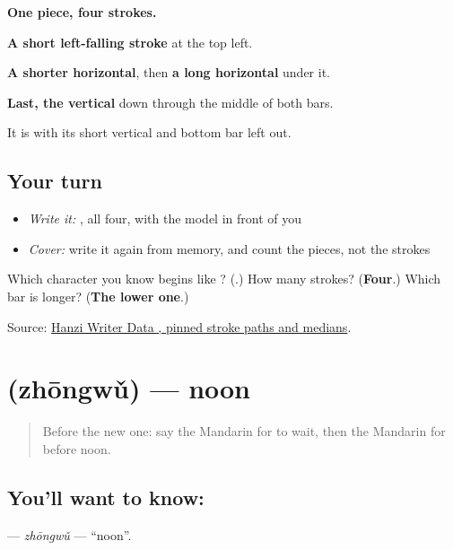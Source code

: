 \begin{quote}
\end{quote}

\textbf{One piece, four strokes.}

\textbf{A short left-falling stroke} at the top left.

\textbf{A shorter horizontal}, then \textbf{a long horizontal} under it.

\textbf{Last, the vertical} down through the middle of both bars.

It is  with its short vertical and bottom bar left out.

\subsection*{Your turn}
\begin{itemize}
\raggedright
  \item \emph{Write it:} , all four, with the model in front of you
  \item \emph{Cover:} write it again from memory, and count the pieces, not the strokes
\end{itemize}

\begin{tcolorbox}[breakable,colback=teal!4,colframe=teal!35!black,title={Before you move on}]
Which character you know begins like ? (\textbf{}.) How many strokes? (\textbf{Four}.) Which bar is longer? (\textbf{The lower one}.)

Source: \href{https://raw.githubusercontent.com/chanind/hanzi-writer-data/68d10a4b21150cae5e1ebbd223eed289cf32d90c/data/\%E5\%8D\%88.json}{Hanzi Writer Data , pinned stroke paths and medians}.
\end{tcolorbox}
\section[\texorpdfstring{\zh{中午} (zhōngwǔ)}{中午 (zhōngwǔ)}]{ (zhōngwǔ) — noon}

\label{lesson:ZH-C49-zhongwu}



\begin{quote}
Before the new one: say the Mandarin for to wait, then the Mandarin for before noon.
\end{quote}

\subsection*{You'll want to know: }
\textbf{} — \emph{zhōngwǔ} — \textquotedblleft{}noon\textquotedblright{}.

